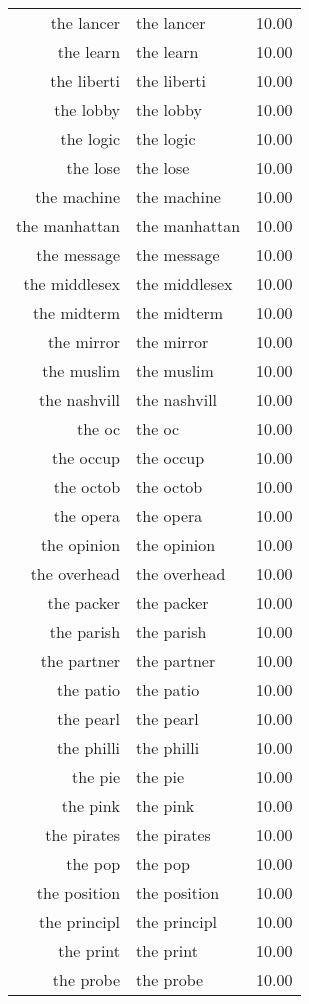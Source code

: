 \begin{table}[ht]
\begin{tabular}{rlr}
  the lancer & the lancer & 10.00 \\ 
  the learn & the learn & 10.00 \\ 
  the liberti & the liberti & 10.00 \\ 
  the lobby & the lobby & 10.00 \\ 
  the logic & the logic & 10.00 \\ 
  the lose & the lose & 10.00 \\ 
  the machine & the machine & 10.00 \\ 
  the manhattan & the manhattan & 10.00 \\ 
  the message & the message & 10.00 \\ 
  the middlesex & the middlesex & 10.00 \\ 
  the midterm & the midterm & 10.00 \\ 
  the mirror & the mirror & 10.00 \\ 
  the muslim & the muslim & 10.00 \\ 
  the nashvill & the nashvill & 10.00 \\ 
  the oc & the oc & 10.00 \\ 
  the occup & the occup & 10.00 \\ 
  the octob & the octob & 10.00 \\ 
  the opera & the opera & 10.00 \\ 
  the opinion & the opinion & 10.00 \\ 
  the overhead & the overhead & 10.00 \\ 
  the packer & the packer & 10.00 \\ 
  the parish & the parish & 10.00 \\ 
  the partner & the partner & 10.00 \\ 
  the patio & the patio & 10.00 \\ 
  the pearl & the pearl & 10.00 \\ 
  the philli & the philli & 10.00 \\ 
  the pie & the pie & 10.00 \\ 
  the pink & the pink & 10.00 \\ 
  the pirates & the pirates & 10.00 \\ 
  the pop & the pop & 10.00 \\ 
  the position & the position & 10.00 \\ 
  the principl & the principl & 10.00 \\ 
  the print & the print & 10.00 \\ 
  the probe & the probe & 10.00 \\ 

\end{tabular}
\end{table}

